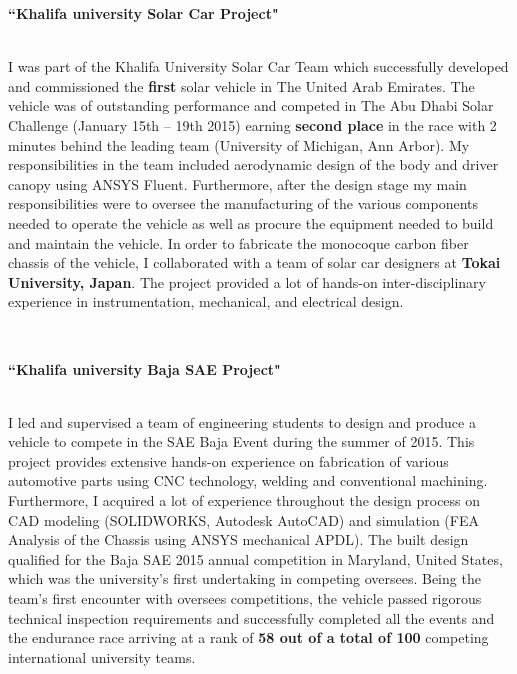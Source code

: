 \documentclass[10pt]{article} %
\begin{document}
{\raggedright\textbf{``Khalifa university Solar Car Project"}}\\
I was part of the Khalifa University Solar Car Team which successfully developed and commissioned the \textbf{first} solar vehicle in The United Arab Emirates. The vehicle was of outstanding performance and competed in The Abu Dhabi Solar Challenge (January 15th – 19th 2015) earning \textbf{second place} in the race with 2 minutes behind the leading team (University of Michigan, Ann Arbor). My responsibilities in the team included aerodynamic design of the body and driver canopy using ANSYS Fluent. Furthermore, after the design stage my main responsibilities were to oversee the manufacturing of the various components needed to operate the vehicle as well as procure the equipment needed to build and maintain the vehicle. In order to fabricate the monocoque carbon fiber chassis of the vehicle, I collaborated with a team of solar car designers at \textbf{Tokai University, Japan}. The project provided a lot of hands-on inter-disciplinary experience in instrumentation, mechanical, and electrical design.

~~~

\medskip %

{\raggedright\textbf{``Khalifa university Baja SAE Project"}}\\
I led and supervised a team of engineering students to design and produce a vehicle to compete in the SAE Baja Event during the summer of 2015. This project provides extensive hands-on experience on fabrication of various automotive parts using CNC technology, welding and conventional machining. Furthermore, I acquired a lot of experience throughout the design process on CAD modeling (SOLIDWORKS, Autodesk AutoCAD) and simulation (FEA Analysis of the Chassis using ANSYS mechanical APDL). The built design qualified for the Baja SAE 2015 annual competition in Maryland, United States, which was the university’s first undertaking in competing oversees. Being the team’s first encounter with oversees competitions, the vehicle passed rigorous technical inspection requirements and successfully completed all the events and the endurance race arriving at a rank of \textbf{58 out of a total of 100} competing international university teams.
\end{document}
